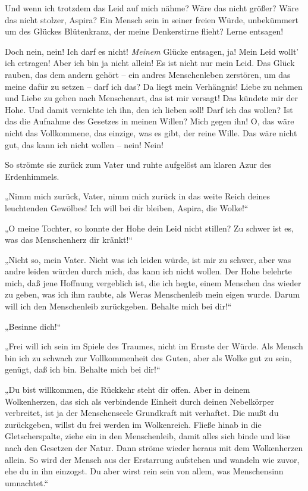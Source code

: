 Und wenn ich trotzdem das Leid auf mich nähme? Wäre das nicht
größer? Wäre das nicht stolzer, Aspira? Ein Mensch sein in seiner
freien Würde, unbekümmert um des Glückes Blütenkranz, der meine
Denkerstirne flieht? Lerne entsagen!

Doch nein, nein! Ich darf es nicht! \emph{Meinem} Glücke entsagen,
ja! Mein Leid wollt' ich ertragen! Aber ich bin ja nicht allein! Es
ist nicht nur mein Leid. Das Glück rauben, das dem andern gehört –
ein andres Menschenleben zerstören, um das meine dafür zu setzen –
darf ich das? Da liegt mein Verhängnis! Liebe zu nehmen und Liebe
zu geben nach Menschenart, das ist mir versagt! Das kündete mir der
Hohe. Und damit vernichte ich ihn, den ich lieben soll! Darf ich
das wollen? Ist das die Aufnahme des Gesetzes in meinen Willen?
Mich gegen ihn! O, das wäre nicht das Vollkommene, das einzige, was
es gibt, der reine Wille. Das wäre nicht gut, das kann ich nicht
wollen – nein! Nein!

So strömte sie zurück zum Vater und ruhte aufgelöst am klaren Azur
des Erdenhimmels.

„Nimm mich zurück, Vater, nimm mich zurück in das weite Reich
deines leuchtenden Gewölbes! Ich will bei dir bleiben, Aspira, die
Wolke!“

„O meine Tochter, so konnte der Hohe dein Leid nicht stillen? Zu
schwer ist es, was das Menschenherz dir kränkt!“

„Nicht so, mein Vater. Nicht was ich leiden würde, ist mir zu
schwer, aber was andre leiden würden durch mich, das kann ich nicht
wollen. Der Hohe belehrte mich, daß jene Hoffnung vergeblich ist,
die ich hegte, einem Menschen das wieder zu geben, was ich ihm
raubte, als Weras Menschenleib mein eigen wurde. Darum will ich den
Menschenleib zurückgeben. Behalte mich bei dir!“

„Besinne dich!“

„Frei will ich sein im Spiele des Traumes, nicht im Ernste der
Würde. Als Mensch bin ich zu schwach zur Vollkommenheit des Guten,
aber als Wolke gut zu sein, genügt, daß ich bin. Behalte mich bei
dir!“

„Du bist willkommen, die Rückkehr steht dir offen. Aber in deinem
Wolkenherzen, das sich als verbindende Einheit durch deinen
Nebelkörper verbreitet, ist ja der Menschenseele Grundkraft mit
verhaftet. Die mußt du zurückgeben, willst du frei werden im
Wolkenreich. Fließe hinab in die Gletscherspalte, ziehe ein in den
Menschenleib, damit alles sich binde und löse nach den Gesetzen der
Natur. Dann ströme wieder heraus mit dem Wolkenherzen allein. So
wird der Mensch aus der Erstarrung aufstehen und wandeln wie zuvor,
ehe du in ihn einzogst. Du aber wirst rein sein von allem, was
Menschensinn umnachtet.“

